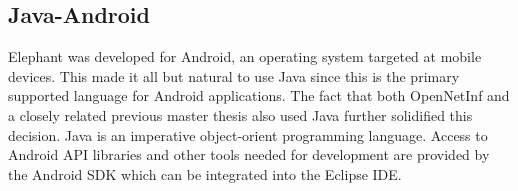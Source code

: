 \subsection{Java-Android}

Elephant was developed for Android, an operating system targeted at mobile devices. This made it all but natural to use Java since this is the primary supported language for Android applications. The fact that both OpenNetInf and a closely related previous master thesis \cite{masterthesis} also used Java further solidified this decision. Java is an imperative object-orient programming language. Access to Android API libraries and other tools needed for development are provided by the Android SDK which can be integrated into the Eclipse IDE.
